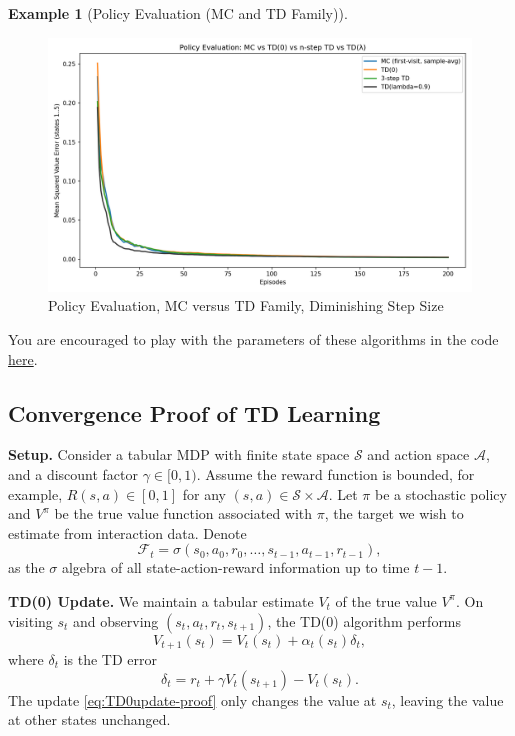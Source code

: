 \documentclass[
]{book}
\theoremstyle{definition}
\theoremstyle{definition}
\newtheorem{example}{Example}[chapter]
\theoremstyle{definition}
\theoremstyle{definition}
\theoremstyle{remark}
\begin{document}
\begin{example}[Policy Evaluation (MC and TD Family)]
\begin{figure}

{\centering \includegraphics[width=0.9\linewidth]{images/Value-RL/mc_td_comparison_diminishing_step} 

}

\caption{Policy Evaluation, MC versus TD Family, Diminishing Step Size}\label{fig:policy-evaluation-random-walk-diminishing-step-size}
\end{figure}

You are encouraged to play with the parameters of these algorithms in the code \href{https://github.com/ComputationalRobotics/2025-ES-AM-158-LECTURE-CODE/blob/main/policy_evaluation_mc_td.py}{here}.
\end{example}

\subsection{Convergence Proof of TD Learning}\label{value-rl-convergence-td}

\textbf{Setup.} Consider a tabular MDP with finite state space \(\mathcal{S}\) and action space \(\mathcal{A}\), and a discount factor \(\gamma \in [0,1)\). Assume the reward function is bounded, for example, \(R(s,a) \in [0,1]\) for any \((s,a) \in \mathcal{S} \times \mathcal{A}\). Let \(\pi\) be a stochastic policy and \(V^\pi\) be the true value function associated with \(\pi\), the target we wish to estimate from interaction data. Denote
\[
\mathcal{F}_t = \sigma(s_0,a_0,r_0,\dots,s_{t-1},a_{t-1},r_{t-1}),
\]
as the \(\sigma\) algebra of all state-action-reward information up to time \(t-1\).

\textbf{TD(0) Update.} We maintain a tabular estimate \(V_t\) of the true value \(V^\pi\). On visiting \(s_t\) and observing \((s_t, a_t, r_t, s_{t+1})\), the TD(0) algorithm performs
\begin{equation}
V_{t+1}(s_t) = V_t(s_t) + \alpha_t(s_t) \delta_t,
\label{eq:TD0update-proof}
\end{equation}
where \(\delta_t\) is the TD error
\[
\delta_t = r_t + \gamma V_{t}(s_{t+1}) - V_t(s_t).
\]
The update \eqref{eq:TD0update-proof} only changes the value at \(s_t\), leaving the value at other states unchanged.
\end{document}
